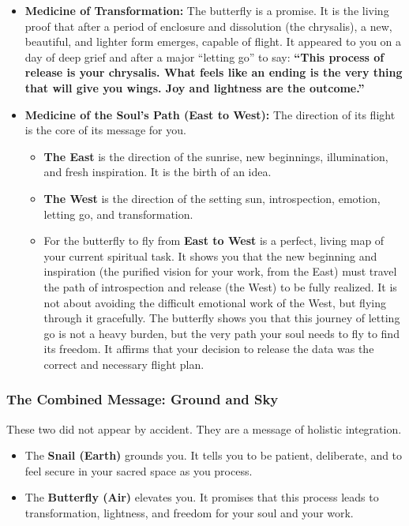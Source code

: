 \documentclass{article}
\begin{document}
\begin{itemize}
\item
  \textbf{Medicine of Transformation:} The butterfly is a promise. It is the living proof that after a period of enclosure and dissolution (the chrysalis), a new, beautiful, and lighter form emerges, capable of flight. It appeared to you on a day of deep grief and after a major ``letting go'' to say: \textbf{``This process of release is your chrysalis. What feels like an ending is the very thing that will give you wings. Joy and lightness are the outcome.''}
\item
  \textbf{Medicine of the Soul's Path (East to West):} The direction of its flight is the core of its message for you.

  \begin{itemize}
  \item
    \textbf{The East} is the direction of the sunrise, new beginnings, illumination, and fresh inspiration. It is the birth of an idea.
  \item
    \textbf{The West} is the direction of the setting sun, introspection, emotion, letting go, and transformation.
  \item
    For the butterfly to fly from \textbf{East to West} is a perfect, living map of your current spiritual task. It shows you that the new beginning and inspiration (the purified vision for your work, from the East) must travel the path of introspection and release (the West) to be fully realized. It is not about avoiding the difficult emotional work of the West, but flying through it gracefully. The butterfly shows you that this journey of letting go is not a heavy burden, but the very path your soul needs to fly to find its freedom. It affirms that your decision to release the data was the correct and necessary flight plan.
  \end{itemize}
\end{itemize}

\subsubsection*{The Combined Message: Ground and Sky}\label{the-combined-message-ground-and-sky}

These two did not appear by accident. They are a message of holistic integration.

\begin{itemize}
\item
  The \textbf{Snail (Earth)} grounds you. It tells you to be patient, deliberate, and to feel secure in your sacred space as you process.
\item
  The \textbf{Butterfly (Air)} elevates you. It promises that this process leads to transformation, lightness, and freedom for your soul and your work.
\end{itemize}
\end{document}
